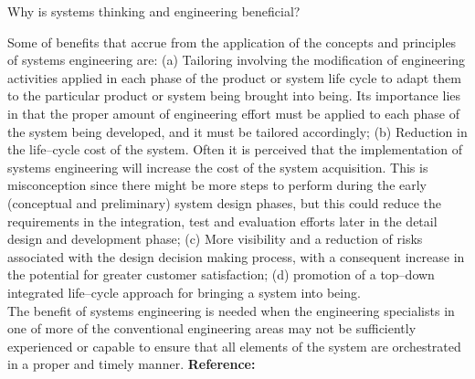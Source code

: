 \begin{exercises}
    \begin{exercise}
    \label{sea-02-24}
        Why is systems thinking and engineering beneficial?
    \end{exercise}
    \begin{solution}
        Some of benefits that accrue from the application of the concepts and principles of systems engineering are: (a) Tailoring involving the modification of engineering activities applied in each phase of the product or system life cycle to adapt them to the particular product or system being brought into being. Its importance lies in that the proper amount of engineering effort must be applied to each phase of the system being developed, and it must be tailored accordingly; (b) Reduction in the life–cycle cost of the system. Often it is perceived that the implementation of systems engineering will increase the cost of the system acquisition. This is misconception since there might be more steps to perform during the early (conceptual and preliminary) system design phases, but this could reduce the requirements in the integration, test and evaluation efforts later in the detail design and development phase; (c) More visibility and a reduction of risks associated with the design decision making process, with a consequent increase in the potential for greater customer satisfaction; (d) promotion of a top–down integrated life–cycle approach for bringing a system into being. \\
        The benefit of systems engineering is needed when the engineering specialists in one of more of the conventional engineering areas may not be sufficiently experienced or capable to ensure that all elements of the system are orchestrated in a proper and timely manner. \textbf{Reference:}
    \end{solution}
\end{exercises}

